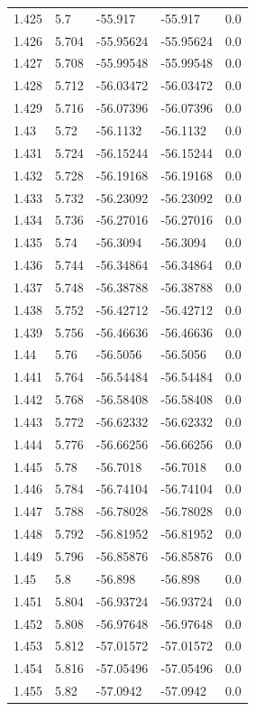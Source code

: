 \begin{tabular}{lllll}
1.425 & 5.7 & -55.917 & -55.917 & 0.0 \\
1.426 & 5.704 & -55.95624 & -55.95624 & 0.0 \\
1.427 & 5.708 & -55.99548 & -55.99548 & 0.0 \\
1.428 & 5.712 & -56.03472 & -56.03472 & 0.0 \\
1.429 & 5.716 & -56.07396 & -56.07396 & 0.0 \\
1.43 & 5.72 & -56.1132 & -56.1132 & 0.0 \\
1.431 & 5.724 & -56.15244 & -56.15244 & 0.0 \\
1.432 & 5.728 & -56.19168 & -56.19168 & 0.0 \\
1.433 & 5.732 & -56.23092 & -56.23092 & 0.0 \\
1.434 & 5.736 & -56.27016 & -56.27016 & 0.0 \\
1.435 & 5.74 & -56.3094 & -56.3094 & 0.0 \\
1.436 & 5.744 & -56.34864 & -56.34864 & 0.0 \\
1.437 & 5.748 & -56.38788 & -56.38788 & 0.0 \\
1.438 & 5.752 & -56.42712 & -56.42712 & 0.0 \\
1.439 & 5.756 & -56.46636 & -56.46636 & 0.0 \\
1.44 & 5.76 & -56.5056 & -56.5056 & 0.0 \\
1.441 & 5.764 & -56.54484 & -56.54484 & 0.0 \\
1.442 & 5.768 & -56.58408 & -56.58408 & 0.0 \\
1.443 & 5.772 & -56.62332 & -56.62332 & 0.0 \\
1.444 & 5.776 & -56.66256 & -56.66256 & 0.0 \\
1.445 & 5.78 & -56.7018 & -56.7018 & 0.0 \\
1.446 & 5.784 & -56.74104 & -56.74104 & 0.0 \\
1.447 & 5.788 & -56.78028 & -56.78028 & 0.0 \\
1.448 & 5.792 & -56.81952 & -56.81952 & 0.0 \\
1.449 & 5.796 & -56.85876 & -56.85876 & 0.0 \\
1.45 & 5.8 & -56.898 & -56.898 & 0.0 \\
1.451 & 5.804 & -56.93724 & -56.93724 & 0.0 \\
1.452 & 5.808 & -56.97648 & -56.97648 & 0.0 \\
1.453 & 5.812 & -57.01572 & -57.01572 & 0.0 \\
1.454 & 5.816 & -57.05496 & -57.05496 & 0.0 \\
1.455 & 5.82 & -57.0942 & -57.0942 & 0.0 \\

\end{tabular}
